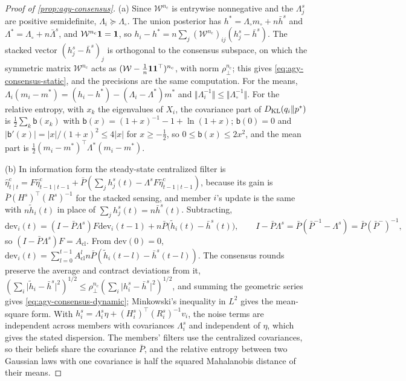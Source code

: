 \begin{proof}[Proof of \cref{prop:agy-consensus}]
(a) Since $\mathcal W^{n_{\mathrm c}}$ is entrywise nonnegative and the $\Lambda^s_j$ are positive semidefinite, $\Lambda_i\succeq\Lambda_\circ$. The union posterior has $h^\ast=\Lambda_\circ m_\circ+n\bar h^s$ and $\Lambda^\ast=\Lambda_\circ+n\bar\Lambda^s$, and $\mathcal W^{n_{\mathrm c}}\mathbf{1}=\mathbf{1}$, so $h_i-h^\ast=n\sum_j(\mathcal W^{n_{\mathrm c}})_{ij}(h^s_j-\bar h^s)$. The stacked vector $(h^s_j-\bar h^s)_j$ is orthogonal to the consensus subspace, on which the symmetric matrix $\mathcal W^{n_{\mathrm c}}$ acts as $(\mathcal W-\frac1n\mathbf{1}\mathbf{1}^\top)^{n_{\mathrm c}}$, with norm $\rho_\perp^{n_{\mathrm c}}$; this gives \eqref{eq:agy-consensus-static}, and the precisions are the same computation. For the means, $\Lambda_i(m_i-m^\ast)=(h_i-h^\ast)-(\Lambda_i-\Lambda^\ast)m^\ast$ and $\Vert\Lambda_i^{-1}\Vert\le\Vert\Lambda_\circ^{-1}\Vert$. For the relative entropy, with $x_k$ the eigenvalues of $X_i$, the covariance part of $D_{\mathrm{KL}}(q_i\Vert p^\ast)$ is $\frac12\sum_k\mathsf b(x_k)$ with $\mathsf b(x)=(1+x)^{-1}-1+\ln(1+x)$; $\mathsf b(0)=0$ and $\lvert\mathsf b'(x)\rvert=\lvert x\rvert/(1+x)^2\le4\lvert x\rvert$ for $x\ge-\frac12$, so $0\le\mathsf b(x)\le2x^2$, and the mean part is $\frac12(m_i-m^\ast)^\top\Lambda^\ast(m_i-m^\ast)$.

(b) In information form the steady-state centralized filter is $\hat\eta^{\mathrm c}_{t\mid t}=F\hat\eta^{\mathrm c}_{t-1\mid t-1}+\bar P(\sum_jh^s_j(t)-\Lambda^sF\hat\eta^{\mathrm c}_{t-1\mid t-1})$, because its gain is $\bar P(H^s)^\top(R^s)^{-1}$ for the stacked sensing, and member $i$'s update is the same with $n\tilde h_i(t)$ in place of $\sum_jh^s_j(t)=n\bar h^s(t)$. Subtracting,
\begin{equation*}
\mathrm{dev}_i(t)=(I-\bar P\Lambda^s)F\mathrm{dev}_i(t-1)+n\bar P\bigl(\tilde h_i(t)-\bar h^s(t)\bigr),\qquad I-\bar P\Lambda^s=\bar P(\bar P^{-1}-\Lambda^s)=\bar P(\bar P^-)^{-1},
\end{equation*}
so $(I-\bar P\Lambda^s)F=A_{\mathrm{cl}}$. From $\mathrm{dev}(0)=0$, $\mathrm{dev}_i(t)=\sum_{l=0}^{t-1}A_{\mathrm{cl}}^ln\bar P(\tilde h_i(t-l)-\bar h^s(t-l))$. The consensus rounds preserve the average and contract deviations from it, $(\sum_i\lvert\tilde h_i-\bar h^s\rvert^2)^{1/2}\le\rho_\perp^{n_{\mathrm c}}(\sum_i\lvert h^s_i-\bar h^s\rvert^2)^{1/2}$, and summing the geometric series gives \eqref{eq:agy-consensus-dynamic}; Minkowski's inequality in $L^2$ gives the mean-square form. With $h^s_i=\Lambda^s_i\eta+(H^s_i)^\top(R^s_i)^{-1}v_i$, the noise terms are independent across members with covariances $\Lambda^s_i$ and independent of $\eta$, which gives the stated dispersion. The members' filters use the centralized covariances, so their beliefs share the covariance $\bar P$, and the relative entropy between two Gaussian laws with one covariance is half the squared Mahalanobis distance of their means.
\end{proof}

